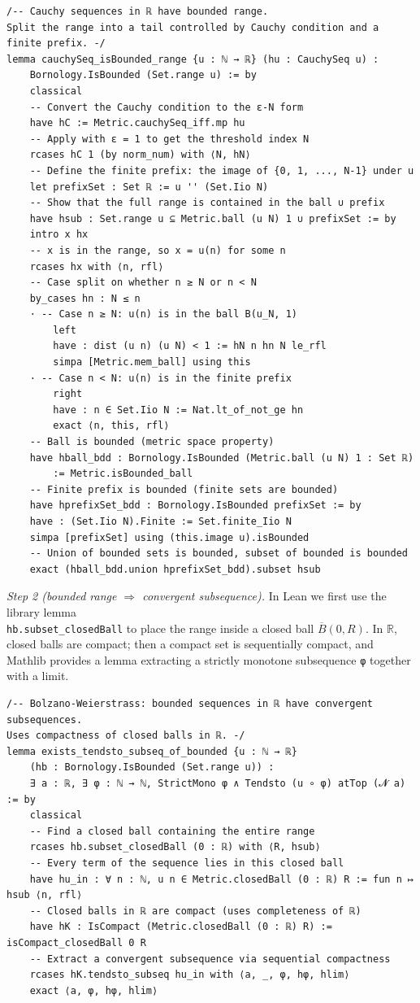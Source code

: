 \documentclass[11pt]{article}
\begin{document}
\begin{verbatim}
/-- Cauchy sequences in ℝ have bounded range.
Split the range into a tail controlled by Cauchy condition and a finite prefix. -/
lemma cauchySeq_isBounded_range {u : ℕ → ℝ} (hu : CauchySeq u) :
    Bornology.IsBounded (Set.range u) := by
    classical
    -- Convert the Cauchy condition to the ε-N form
    have hC := Metric.cauchySeq_iff.mp hu
    -- Apply with ε = 1 to get the threshold index N
    rcases hC 1 (by norm_num) with ⟨N, hN⟩
    -- Define the finite prefix: the image of {0, 1, ..., N-1} under u
    let prefixSet : Set ℝ := u '' (Set.Iio N)
    -- Show that the full range is contained in the ball ∪ prefix
    have hsub : Set.range u ⊆ Metric.ball (u N) 1 ∪ prefixSet := by
    intro x hx
    -- x is in the range, so x = u(n) for some n
    rcases hx with ⟨n, rfl⟩
    -- Case split on whether n ≥ N or n < N
    by_cases hn : N ≤ n
    · -- Case n ≥ N: u(n) is in the ball B(u_N, 1)
        left
        have : dist (u n) (u N) < 1 := hN n hn N le_rfl
        simpa [Metric.mem_ball] using this
    · -- Case n < N: u(n) is in the finite prefix
        right
        have : n ∈ Set.Iio N := Nat.lt_of_not_ge hn
        exact ⟨n, this, rfl⟩
    -- Ball is bounded (metric space property)
    have hball_bdd : Bornology.IsBounded (Metric.ball (u N) 1 : Set ℝ) 
        := Metric.isBounded_ball
    -- Finite prefix is bounded (finite sets are bounded)
    have hprefixSet_bdd : Bornology.IsBounded prefixSet := by
    have : (Set.Iio N).Finite := Set.finite_Iio N
    simpa [prefixSet] using (this.image u).isBounded
    -- Union of bounded sets is bounded, subset of bounded is bounded
    exact (hball_bdd.union hprefixSet_bdd).subset hsub
\end{verbatim}

\smallskip
\noindent
\emph{Step 2 (bounded range \(\Rightarrow\) convergent subsequence).}
In Lean we first use the library lemma \\\verb|hb.subset_closedBall| to place the range inside a closed ball \(\overline{B}(0,R)\).
In \(\mathbb{R}\), closed balls are compact; then a compact set is sequentially compact, and Mathlib provides a lemma
extracting a strictly monotone subsequence \texttt{φ} together with a limit.

\begin{verbatim}
/-- Bolzano-Weierstrass: bounded sequences in ℝ have convergent subsequences.
Uses compactness of closed balls in ℝ. -/
lemma exists_tendsto_subseq_of_bounded {u : ℕ → ℝ}
    (hb : Bornology.IsBounded (Set.range u)) :
    ∃ a : ℝ, ∃ φ : ℕ → ℕ, StrictMono φ ∧ Tendsto (u ∘ φ) atTop (𝓝 a) := by
    classical
    -- Find a closed ball containing the entire range
    rcases hb.subset_closedBall (0 : ℝ) with ⟨R, hsub⟩
    -- Every term of the sequence lies in this closed ball
    have hu_in : ∀ n : ℕ, u n ∈ Metric.closedBall (0 : ℝ) R := fun n ↦ hsub ⟨n, rfl⟩
    -- Closed balls in ℝ are compact (uses completeness of ℝ)
    have hK : IsCompact (Metric.closedBall (0 : ℝ) R) := isCompact_closedBall 0 R
    -- Extract a convergent subsequence via sequential compactness
    rcases hK.tendsto_subseq hu_in with ⟨a, _, φ, hφ, hlim⟩
    exact ⟨a, φ, hφ, hlim⟩
\end{verbatim}
\end{document}
